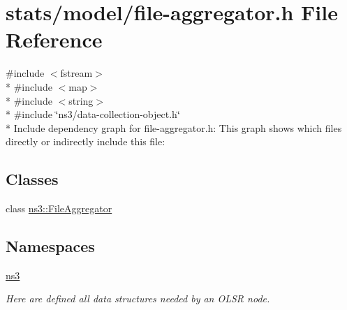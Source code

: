 \hypertarget{file-aggregator_8h}{}\section{stats/model/file-\/aggregator.h File Reference}
\label{file-aggregator_8h}
{\ttfamily \#include $<$fstream$>$}\\*
{\ttfamily \#include $<$map$>$}\\*
{\ttfamily \#include $<$string$>$}\\*
{\ttfamily \#include \char`\"{}ns3/data-\/collection-\/object.\+h\char`\"{}}\\*
Include dependency graph for file-\/aggregator.h\+:
This graph shows which files directly or indirectly include this file\+:
\subsection*{Classes}
\begin{DoxyCompactItemize}
\item 
class \hyperlink{classns3_1_1FileAggregator}{ns3\+::\+File\+Aggregator}
\end{DoxyCompactItemize}
\subsection*{Namespaces}
\begin{DoxyCompactItemize}
\item 
 \hyperlink{namespacens3}{ns3}
\begin{DoxyCompactList}\small\item\em Here are defined all data structures needed by an O\+L\+SR node. \end{DoxyCompactList}\end{DoxyCompactItemize}
